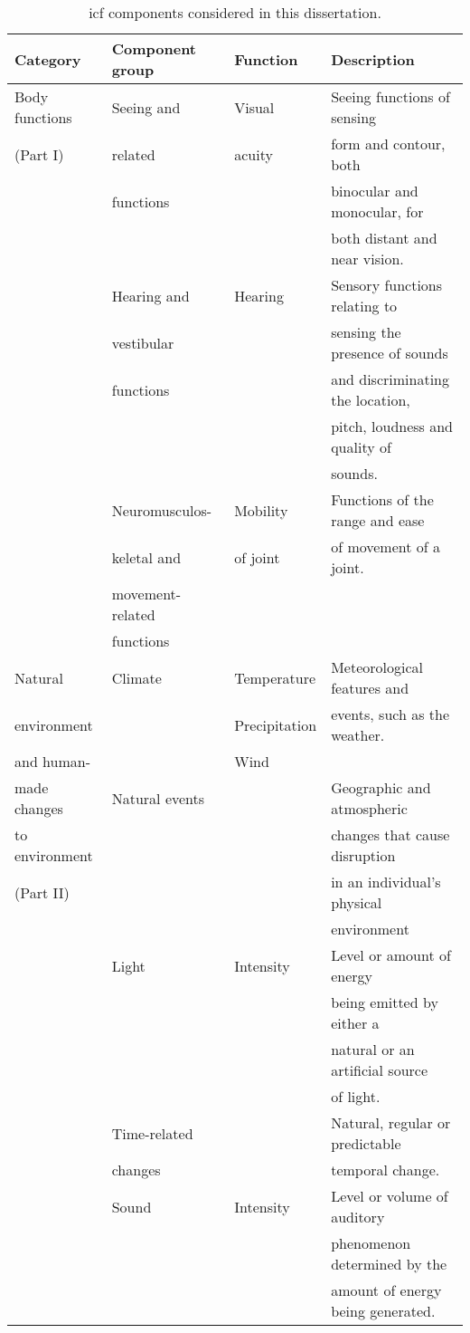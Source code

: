 \begin{table}
  \caption{\ac{icf} components considered in this dissertation.}
  \label{tbl:icf}
  \footnotesize
  \centering
  \begin{tabular}{l l l l}
    \hline
    \textbf{Category} 	& \textbf{Component group}& \textbf{Function}& \textbf{Description}\\
    \hline
    Body functions& Seeing and 	 	& Visual 	& Seeing functions of sensing	\\
    (Part I)	& related		& acuity	& form and contour, both 	\\
		& functions		& 		& binocular and monocular, for 	\\
		& 			& 		& both distant and near vision.	\\
		& Hearing and 		& Hearing 	& Sensory functions relating to \\
		& vestibular		& 		& sensing the presence of sounds\\
		& functions		& 		& and discriminating the location,\\
		& 			&		& pitch, loudness and quality of\\
		&			&		& sounds.			\\
		& Neuromusculos- 	& Mobility	& Functions of the range and ease\\ 
		& keletal and 		& of joint	& of movement of a joint.	\\
		& movement-related 	& 		& 				\\
		& functions		&		&				\\
    \hline
    Natural 	& Climate		& Temperature	& Meteorological features and 	\\
    environment & 			& Precipitation	& events, such as the weather.	\\
    and human-	&			& Wind		& 				\\
    made changes& Natural events	& 		& Geographic and atmospheric 	\\
    to environment& 			& 		& changes that cause disruption \\
    (Part II)	& 			& 		& in an individual's physical 	\\
		& 			& 		& environment			\\
		& Light			& Intensity	& Level or amount of energy 	\\
		& 			& 		& being emitted by either a 	\\
		& 			& 		& natural or an artificial source\\
		& 			& 		& of light.			\\
		& Time-related 		& 		& Natural, regular or predictable\\
		& changes		& 		& temporal change.		\\
		& Sound			& Intensity	& Level or volume of auditory 	\\
		& 			& 		& phenomenon determined by the	\\
		& 			& 		& amount of energy being generated.\\
    \hline
  \end{tabular}
\end{table}


